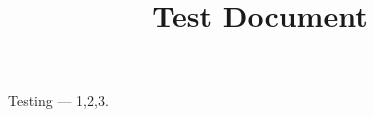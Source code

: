 \documentclass{article}
\title{Test Document}
\begin{document}
\maketitle
Testing --- 1,2,3.
\end{document}
